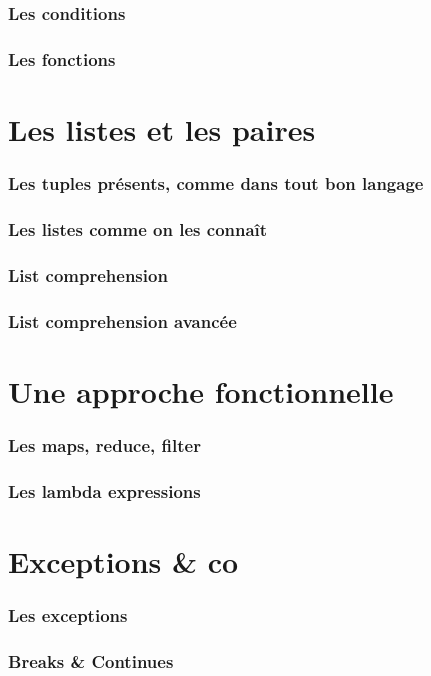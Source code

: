 \documentclass{beamer}
\begin{document}
\begin{frame}
  \frametitle{Les conditions}
\end{frame}

\begin{frame}
  \frametitle{Les fonctions}
\end{frame}

\section{Les listes et les paires}
\label{sec:lists}

\begin{frame}
  \frametitle{Les tuples présents, comme dans tout bon langage}
\end{frame}

\begin{frame}
  \frametitle{Les listes comme on les connaît}
\end{frame}

\begin{frame}
  \frametitle{List comprehension}
\end{frame}

\begin{frame}
  \frametitle{List comprehension avancée}
\end{frame}

\section{Une approche fonctionnelle}
\label{sec:functionnal}

\begin{frame}
  \frametitle{Les maps, reduce, filter}
\end{frame}

\begin{frame}
  \frametitle{Les lambda expressions}
\end{frame}

\section{Exceptions \& co}
\label{sec:except}

\begin{frame}
  \frametitle{Les exceptions}
\end{frame}

\begin{frame}
  \frametitle{Breaks \& Continues}
\end{frame}
\end{document}
